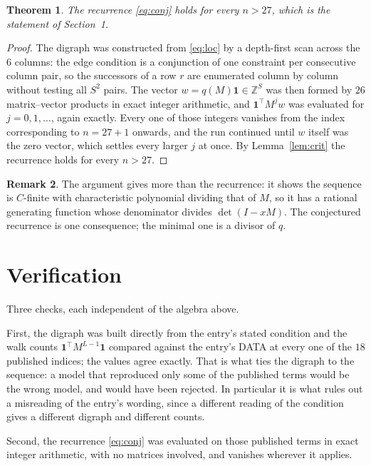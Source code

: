 \documentclass[11pt,a4paper]{article}
\theoremstyle{plain}
\newtheorem{theorem}{Theorem}
\theoremstyle{definition}
\newtheorem{remark}[theorem]{Remark}
\begin{document}
\begin{theorem}
The recurrence \eqref{eq:conj} holds for every $n>27$, which is the statement of
Section~1.
\end{theorem}

\begin{proof}
The digraph was constructed from \eqref{eq:loc} by a depth-first scan across the $6$
columns: the edge condition is a conjunction of one constraint per consecutive column
pair, so the successors of a row $r$ are enumerated column by column without testing all
$S^2$ pairs. The vector $w=q(M)\mathbf{1}\in\mathbb{Z}^{S}$ was then formed by $26$
matrix--vector products in exact integer arithmetic, and $\mathbf{1}^{\!\top}M^{j}w$ was
evaluated for $j=0,1,\dots$, again exactly. Every one of those integers vanishes from the
index corresponding to $n=27+1$ onwards, and the run continued until $w$ itself was the
zero vector, which settles every larger $j$ at once. By Lemma~\ref{lem:crit} the recurrence
holds for every $n>27$.
\end{proof}

\begin{remark}
The argument gives more than the recurrence: it shows the sequence is $C$-finite with
characteristic polynomial dividing that of $M$, so it has a rational generating function
whose denominator divides $\det(I-xM)$. The conjectured recurrence is one consequence; the
minimal one is a divisor of $q$.
\end{remark}

\section{Verification}

Three checks, each independent of the algebra above.

First, the digraph was built directly from the entry's stated condition and the walk counts
$\mathbf{1}^{\!\top}M^{L-1}\mathbf{1}$ compared against the entry's DATA at
every one of the $18$ published indices; the values agree exactly. That is what ties
the digraph to the sequence: a model that reproduced only some of the published terms would
be the wrong model, and would have been rejected. In particular it is what rules out a
misreading of the entry's wording, since a different reading of the condition gives a
different digraph and different counts.

Second, the recurrence \eqref{eq:conj} was evaluated on those published terms in exact
integer arithmetic, with no matrices involved, and vanishes wherever it applies.
\end{document}
